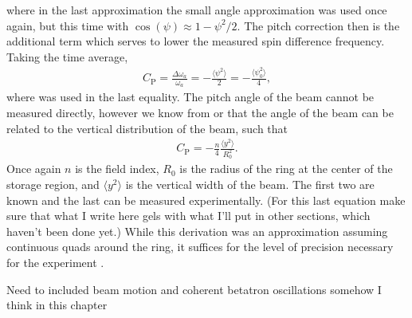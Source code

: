 where in the last approximation the small angle approximation was used once again, but this time with $\cos(\psi) \approx 1 - \psi^{2}/2$. The pitch correction then is the additional term which serves to lower the measured spin difference frequency. Taking the time average,
        \begin{align}
            C_{\text{P}} = \frac{\Delta\omega_{a}}{\omega_{a}} = - \frac{\langle \psi^{2} \rangle}{2} = - \frac{\langle \psi_{0}^{2} \rangle}{4},
        \end{align}
where  was used in the last equality. The pitch angle of the beam cannot be measured directly, however we know from  or  that the angle of the beam can be related to the vertical distribution of the beam, such that 
        \begin{align}
            C_{\text{P}} = - \frac{n}{4} \frac{\langle y^{2} \rangle}{R_{0}^{2}}.
        \end{align}
Once again $n$ is the field index, $R_{0}$ is the radius of the ring at the center of the storage region, and $\langle y^{2} \rangle$ is the vertical width of the beam. The first two are known and the last can be measured experimentally. (For this last equation make sure that what I write here gels with what I'll put in other sections, which haven't been done yet.) While this derivation was an approximation assuming continuous quads around the ring, it suffices for the level of precision necessary for the \gmtwo experiment \cite{something}.










\clearpage



Need to included beam motion and coherent betatron oscillations somehow I think in this chapter



\clearpage





